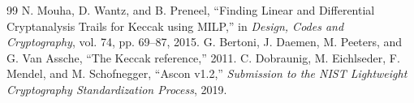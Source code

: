\documentclass[journal,compsoc]{IEEEtran}
\begin{document}
\begin{thebibliography}{99}
 N. Mouha, D. Wantz, and B. Preneel, ``Finding Linear and Differential Cryptanalysis Trails for Keccak using MILP,'' in \emph{Design, Codes and Cryptography}, vol. 74, pp. 69--87, 2015.
 G. Bertoni, J. Daemen, M. Peeters, and G. Van Assche, ``The Keccak reference,'' 2011.
 C. Dobraunig, M. Eichlseder, F. Mendel, and M. Schofnegger, ``Ascon v1.2,'' \emph{Submission to the NIST Lightweight Cryptography Standardization Process}, 2019.
\end{thebibliography}
\end{document}
